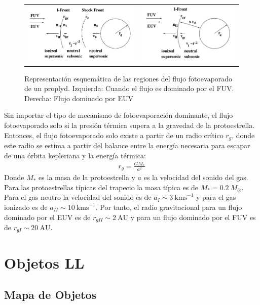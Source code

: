   \begin{figure}
    \begin{tabular}{cc}
      \includegraphics[width=0.5\linewidth]{./Figures/Johnstone-2} &
      \includegraphics[width=0.5\linewidth]{./Figures/Johnstone-3}
    \end{tabular}
    \label{fig:EUV-FUV-IF}
    \caption{Representación esquemática de las regiones del flujo
      fotoevaporado de un proplyd. Izquierda: Cuando el flujo es dominado
    por el FUV. Derecha: Flujo dominado por EUV \citep{Johnstone:1998}}
  \end{figure}
  

Sin importar el tipo de mecanismo de fotoevaporación dominante, el flujo
fotoevaporado solo si la presión térmica supera a la gravedad de la
protoestrella. Entonces, el flujo fotoevaporado solo existe a partir de
un radio crítico $r_g$, donde este radio se estima a partir del balance
entre la energía necesaria para escapar de una órbita kepleriana y la
energía térmica:
\begin{align}
  r_g = \frac{GM_*}{a^2}
\end{align}
Donde $M_*$ es la masa de la protoestrella y $a$ es la velocidad del sonido
del gas. Para las protoestrellas típicas del trapecio la masa típica es de
$M_* = 0.2~M_\odot$. Para el gas neutro la velocidad del sonido es de
$a_I \sim 3~\mathrm{kms}^{-1}$ y para el gas ionizado es de $a_{II} \sim 10~\mathrm{kms}^{-1}$.
Por tanto, el radio gravitacional para un flujo dominado por el EUV es de
$r_{gII} \sim 2~\mathrm{AU}$ y para un flujo dominado por el FUV es de
$r_{gI} \sim 20~\mathrm{AU}$.
\section{Objetos LL}
\subsection{Mapa de Objetos}
